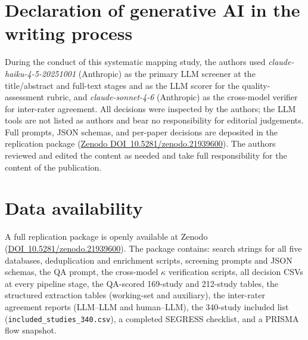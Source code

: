 \documentclass[review,3p,times]{elsarticle}
\newcommand{\zenododoi}{10.5281/zenodo.21939600}
\newcommand{\zenododoiurl}{https://doi.org/\zenododoi}
\begin{document}
\section*{Declaration of generative AI in the writing process}
During the conduct of this systematic mapping study, the authors used
\textit{claude-haiku-4-5-20251001} (Anthropic) as the primary LLM screener
at the title/abstract and full-text stages and as the LLM scorer for the
quality-assessment rubric, and \textit{claude-sonnet-4-6} (Anthropic) as
the cross-model verifier for inter-rater agreement. All decisions were
inspected by the authors; the LLM tools are not listed as authors and
bear no responsibility for editorial judgements. Full prompts, JSON
schemas, and per-paper decisions are deposited in the replication package
(\href{\zenododoiurl}{Zenodo
DOI~\zenododoi}). The authors reviewed and edited the content
as needed and take full responsibility for the content of the
publication.

\section*{Data availability}
A full replication package is openly available at Zenodo
(\href{\zenododoiurl}{DOI~\zenododoi}).
The package contains: search strings for all five databases, deduplication
and enrichment scripts, screening prompts and JSON schemas, the QA prompt,
the cross-model $\kappa$ verification scripts, all decision CSVs at every
pipeline stage, the QA-scored 169-study and 212-study tables, the
structured extraction tables (working-set and auxiliary), the inter-rater
agreement reports (LLM--LLM and human--LLM), the 340-study included list
(\texttt{included\_studies\_340.csv}), a completed SEGRESS checklist, and a
PRISMA flow snapshot.


\end{document}
